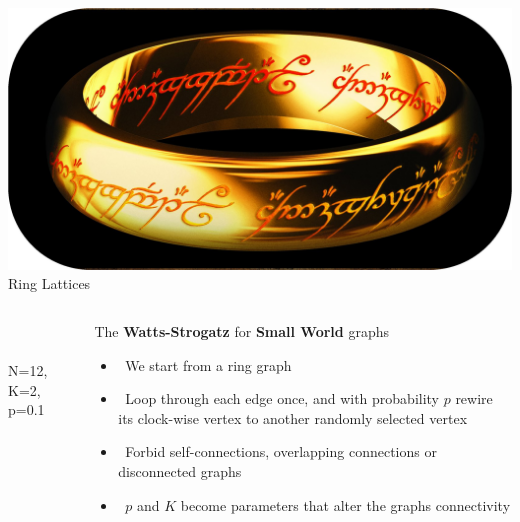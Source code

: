 \documentclass[serif,mathserif]{beamer}
\begin{document}
\begin{frame}{\includegraphics[height=0.06\textheight]{ring-of-power.eps}\hspace{0.25cm} Ring Lattices}
    \begin{columns}
        \begin{column}{.5\textwidth}
            \\
            \vspace{0.1cm}
            \\
            N=12, K=2, p=0.1
        \end{column}
        \begin{column}{.5\textwidth}
            The \textbf{Watts-Strogatz} for \textbf{Small World} graphs
            \begin{itemize}
                \vspace{0.25cm}
                \item \ \pause We start from a ring graph
                \vspace{0.25cm}
                \item \ \pause Loop through each edge once, and with probability $p$ rewire its clock-wise vertex to another randomly selected vertex
                \vspace{0.25cm}
                \item \ \pause Forbid self-connections, overlapping connections or disconnected graphs
                \vspace{0.25cm}
                \item \ \pause $p$ and $K$ become parameters that alter the graphs connectivity
            \end{itemize}
        \end{column}
    \end{columns}
\end{frame}
\end{document}
